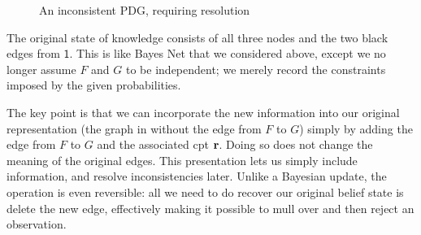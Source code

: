 \documentclass{article}
\newcommand{\MN}{PDG}
\numberwithin{equation}{section}
\begin{document}
\begin{example}
\begin{figure}[htb]
{
			}
			\caption{An inconsistent \MN, requiring resolution}
			\label{fig:gun-floomp-diagram}
		\end{figure}


		The original state of knowledge consists of all three nodes and the two black edges from $\mathsf 1$. This is like Bayes Net that we considered above, except we no longer assume $F$ and $G$ to be independent; we merely record the constraints imposed by the given probabilities.
	
		The key point is that we can incorporate the new information into
		our original representation (the graph in 
		without the edge from $F$ to $G$) simply  by adding the edge from $F$
		to $G$ and the associated cpt $\mathbf r$.  Doing so does not change the meaning
		of the original edges.  This presentation lets us simply include
		information, and resolve inconsistencies later. Unlike a Bayesian
		update, the operation is even reversible: all we need to do recover
		our original belief state is delete the new edge, effectively making
		it possible to mull over and then reject an observation.
	\end{example}
\end{document}

